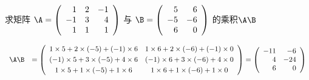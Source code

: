\begin{li}
  求矩阵
  $
  \A = \left(
    \begin{array}{rrrr}
      1&2&-1\\
      -1&3&4\\
      1&1&1
    \end{array}
  \right)
  $
  与
  $
  \B = \left(
    \begin{array}{rrrr}
      5&6\\
      -5&-6\\
      6&0
    \end{array}
  \right)
  $
  的乘积$\A\B$
\end{li}
\begin{jie}
  $$
  \begin{array}{cl}
    \A\B & = \left(
           \begin{array}{ccc}
             1\times5 + 2\times(-5) + (-1)\times6 &
                                                    1\times6 + 2\times(-6) + (-1)\times0 \\[0.1cm]
             (-1)\times5 + 3\times(-5) +    4\times6 &
                                                       (-1)\times6 + 3\times(-6) +    4\times0 \\[0.1cm]
             1\times5 + 1\times(-5) +    1\times6 &
                                                    1\times6 + 1\times(-6) +    1\times0 
           \end{array}
                                                    \right)  =\left(
                                                    \begin{array}{rr}
                                                      -11 & -6\\
                                                      4 & -24\\
                                                      6 & 0
                                                    \end{array}
                                                          \right)   
  \end{array}
  $$
\end{jie}

